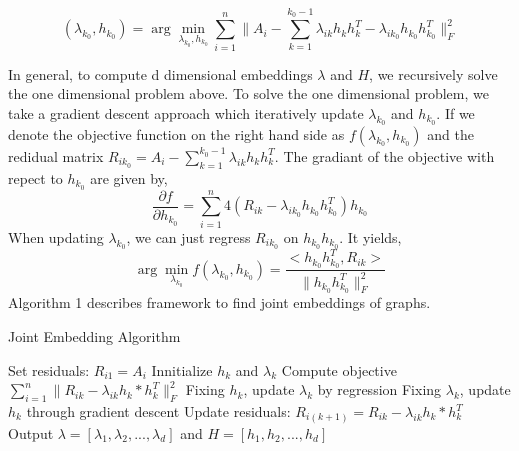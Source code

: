 \documentclass[a4paper]{article}
\begin{document}
\[ (\lambda_{k_0},h_{k_0}) = \arg\min_{\lambda_{k_0},h_{k_0}} \sum\limits_{i=1}^{n} \| A_i- \sum\limits_{k=1}^{k_0-1} \lambda_{ik} h_k h_k^T -\lambda_{ik_0} h_{k_0} h_{k_0}^T\| _F ^2 \]  

\noindent In general, to compute d dimensional embeddings $\lambda$ and $H$, we recursively solve the one dimensional problem above. To solve the one dimensional problem, we take a gradient descent approach which iteratively update $\lambda_{k_0}$ and $h_{k_0}$. If we denote the objective function on the right hand side as $f(\lambda_{k_0},h_{k_0})$ and the redidual matrix $R_{ik_0}=A_i- \sum\limits_{k=1}^{k_0-1} \lambda_{ik} h_k h_k^T$. The gradiant of the objective with repect to $h_{k_0}$ are given by,
\[ \frac{\partial f}{\partial h_{k_0}} = \sum\limits_{i=1}^{n} 4(R_{ik}-\lambda_{ik_0} h_{k_0} h_{k_0}^T) h_{k_0}\]
When updating $\lambda_{k_0}$, we can just regress $R_{ik_0}$ on $h_{k_0} h_{k_0}$. It yields,
\[  \arg\min_{\lambda_{k_0}}f(\lambda_{k_0},h_{k_0})= \frac{<h_{k_0} h_{k_0}^T,R_{ik}>}{\|h_{k_0} h_{k_0}^T \|_F^{2}} \]
Algorithm 1 describes framework to find joint embeddings of graphs. 

\begin{algorithm}
\caption{Joint Embedding Algorithm}
\begin{algorithmic}[1]
\State Set residuals: $R_{i1}=A_i$
\State Innitialize $h_k$ and $\lambda_k$ 
\State Compute objective $\sum\limits_{i=1}^{n} \| R_{ik}-  \lambda_{ik} h_k*h_k^T \| _F ^2$
\State Fixing $h_k$, update $\lambda_k$ by regression
\State Fixing $\lambda_k$, update $h_k$ through gradient descent
\EndWhile
\State Update residuals: $R_{i(k+1)}=R_{ik}- \lambda_{ik} h_k*h_k^T$
\EndFor
\State Output $\lambda=[\lambda_1,\lambda_2,...,\lambda_d]$ and $H=[h_1,h_2,...,h_d]$
\EndProcedure
\end{algorithmic}
\end{algorithm}
\end{document}
